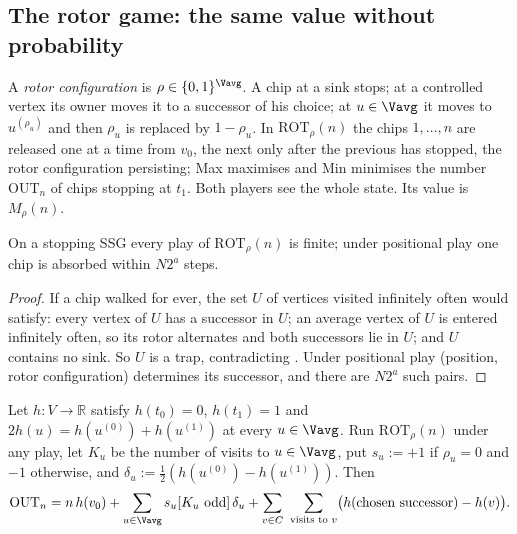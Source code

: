 \subsection{The rotor game: the same value without probability}

\begin{definition}\label{fresh19:def-rotor}
A \emph{rotor configuration} is $\rho\in\{0,1\}^{\Vavg}$.  A chip at a sink
stops; at a controlled vertex its owner moves it to a successor of his choice;
at $u\in\Vavg$ it moves to $u^{(\rho_u)}$ and then $\rho_u$ is replaced by
$1-\rho_u$.  In $\mathrm{ROT}_\rho(n)$ the chips $1,\dots,n$ are released one at
a time from $v_0$, the next only after the previous has stopped, the rotor
configuration persisting; Max maximises and Min minimises the number
$\mathrm{OUT}_n$ of chips stopping at $t_1$.  Both players see the whole state.
Its value is $M_\rho(n)$.
\end{definition}

\begin{lemma}[Termination]\label{fresh19:lem-terminate}
On a stopping SSG every play of $\mathrm{ROT}_\rho(n)$ is finite; under
positional play one chip is absorbed within $N2^{a}$ steps.
\end{lemma}

\begin{proof}
If a chip walked for ever, the set $U$ of vertices visited infinitely often
would satisfy: every vertex of $U$ has a successor in $U$; an average vertex of
$U$ is entered infinitely often, so its rotor alternates and both successors lie
in $U$; and $U$ contains no sink.  So $U$ is a trap, contradicting
.  Under positional play (position, rotor configuration)
determines its successor, and there are $N2^{a}$ such pairs.
\end{proof}

\begin{theorem}\label{fresh19:thm-identity}
Let $h\colon V\to\mathbb R$ satisfy $h(t_0)=0$, $h(t_1)=1$ and
$2h(u)=h(u^{(0)})+h(u^{(1)})$ at every $u\in\Vavg$.  Run $\mathrm{ROT}_\rho(n)$
under any play, let $K_u$ be the number of visits to $u\in\Vavg$, put
$s_u:=+1$ if $\rho_u=0$ and $-1$ otherwise, and
$\delta_u:=\tfrac12(h(u^{(0)})-h(u^{(1)}))$.  Then
\[
  \mathrm{OUT}_n=n\,h(v_0)+\sum_{u\in\Vavg}s_u[K_u\ \text{odd}]\,\delta_u
   +\sum_{v\in C}\ \sum_{\text{visits to }v}\bigl(h(\text{chosen successor})-h(v)\bigr).
\]
\end{theorem}

